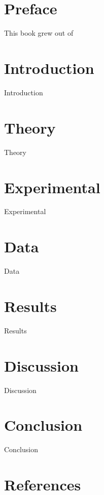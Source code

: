 \documentclass{article}
\title{\experimentTitle \\
        \small \emph{\experimentDescription}}
\author{\href{mailto:\myEmail}{\myName}}
\begin{document}
\maketitle
\thispagestyle{firstpage}

\section*{Preface}

This book grew out of 

\section*{Introduction}

Introduction

\section*{Theory}

Theory

\section*{Experimental}

Experimental

\section*{Data}

Data

\section*{Results}

Results

\section*{Discussion}

Discussion

\section*{Conclusion}

Conclusion

\section*{References}
\end{document}
